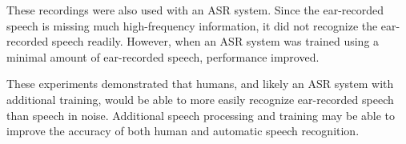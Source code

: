 These recordings were also used with an ASR system.  Since the ear-recorded speech is missing much high-frequency information, it did not recognize the ear-recorded speech readily.  However, when an ASR system was trained using a minimal amount of ear-recorded speech, performance improved.

These experiments demonstrated that humans, and likely an ASR system with additional training, would be able to more easily recognize ear-recorded speech than speech in noise.  Additional speech processing and training may be able to improve the accuracy of both human and automatic speech recognition.

